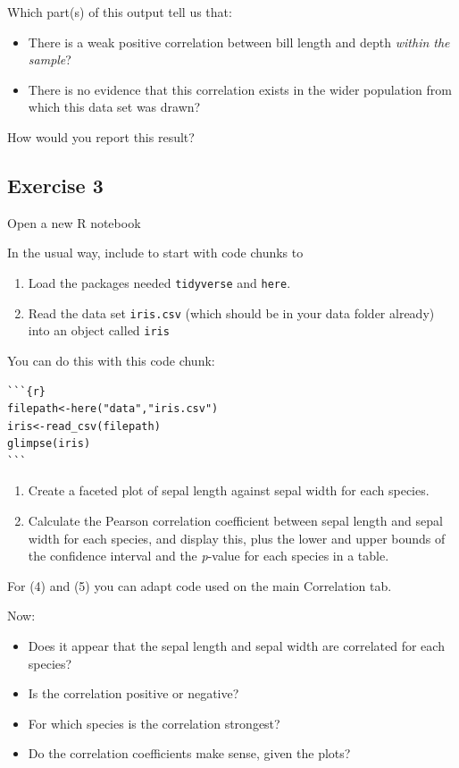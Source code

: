 \documentclass[
]{article}
\providecommand{\tightlist}{%
  \setlength{\itemsep}{0pt}\setlength{\parskip}{0pt}}
\begin{document}
Which part(s) of this output tell us that:

\begin{itemize}
\tightlist
\item
  There is a weak positive correlation between bill length and depth
  \emph{within the sample}?
\item
  There is no evidence that this correlation exists in the wider
  population from which this data set was drawn?
\end{itemize}

How would you report this result?

\subsection{Exercise 3}\label{exercise-3}

Open a new R notebook

In the usual way, include to start with code chunks to

\begin{enumerate}
\def\labelenumi{\arabic{enumi}.}
\tightlist
\item
  Load the packages needed \texttt{tidyverse} and \texttt{here}.
\item
  Read the data set \texttt{iris.csv} (which should be in your data
  folder already) into an object called \texttt{iris}
\end{enumerate}

You can do this with this code chunk:

\begin{verbatim}
```{r}     
filepath<-here("data","iris.csv")
iris<-read_csv(filepath)
glimpse(iris)
```
\end{verbatim}

\begin{enumerate}
\def\labelenumi{\arabic{enumi}.}
\setcounter{enumi}{3}
\item
  Create a faceted plot of sepal length against sepal width for each
  species.
\item
  Calculate the Pearson correlation coefficient between sepal length and
  sepal width for each species, and display this, plus the lower and
  upper bounds of the confidence interval and the \emph{p}-value for
  each species in a table.
\end{enumerate}

For (4) and (5) you can adapt code used on the main Correlation tab.

Now:

\begin{itemize}
\tightlist
\item
  Does it appear that the sepal length and sepal width are correlated
  for each species?\\
\item
  Is the correlation positive or negative?\\
\item
  For which species is the correlation strongest?\\
\item
  Do the correlation coefficients make sense, given the plots?
\end{itemize}
\end{document}
